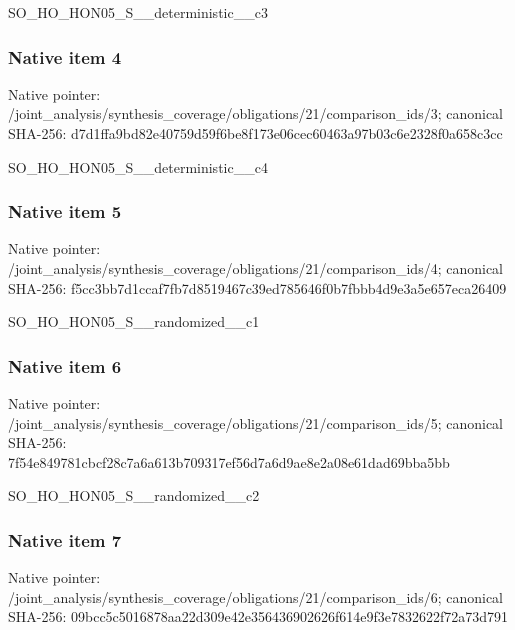 \documentclass[10pt,a4paper]{article}
\begin{document}
\begingroup\raggedright\sloppy SO\_\allowbreak{}HO\_\allowbreak{}HON05\_\allowbreak{}S\_\allowbreak{}\_\allowbreak{}deterministic\_\allowbreak{}\_\allowbreak{}c3\par\endgroup

\subsubsection{Native item 4}
Native pointer: /joint\_\allowbreak{}analysis/synthesis\_\allowbreak{}coverage/obligations/21/comparison\_\allowbreak{}ids/3; canonical SHA-256: d7d1ffa9bd82e40759d59f6be8f173e06cec60463a97b03c6e2328f0a658c3cc

\begingroup\raggedright\sloppy SO\_\allowbreak{}HO\_\allowbreak{}HON05\_\allowbreak{}S\_\allowbreak{}\_\allowbreak{}deterministic\_\allowbreak{}\_\allowbreak{}c4\par\endgroup

\subsubsection{Native item 5}
Native pointer: /joint\_\allowbreak{}analysis/synthesis\_\allowbreak{}coverage/obligations/21/comparison\_\allowbreak{}ids/4; canonical SHA-256: f5cc3bb7d1ccaf7fb7d8519467c39ed785646f0b7fbbb4d9e3a5e657eca26409

\begingroup\raggedright\sloppy SO\_\allowbreak{}HO\_\allowbreak{}HON05\_\allowbreak{}S\_\allowbreak{}\_\allowbreak{}randomized\_\allowbreak{}\_\allowbreak{}c1\par\endgroup

\subsubsection{Native item 6}
Native pointer: /joint\_\allowbreak{}analysis/synthesis\_\allowbreak{}coverage/obligations/21/comparison\_\allowbreak{}ids/5; canonical SHA-256: 7f54e849781cbcf28c7a6a613b709317ef56d7a6d9ae8e2a08e61dad69bba5bb

\begingroup\raggedright\sloppy SO\_\allowbreak{}HO\_\allowbreak{}HON05\_\allowbreak{}S\_\allowbreak{}\_\allowbreak{}randomized\_\allowbreak{}\_\allowbreak{}c2\par\endgroup

\subsubsection{Native item 7}
Native pointer: /joint\_\allowbreak{}analysis/synthesis\_\allowbreak{}coverage/obligations/21/comparison\_\allowbreak{}ids/6; canonical SHA-256: 09bcc5c5016878aa22d309e42e356436902626f614e9f3e7832622f72a73d791
\end{document}
